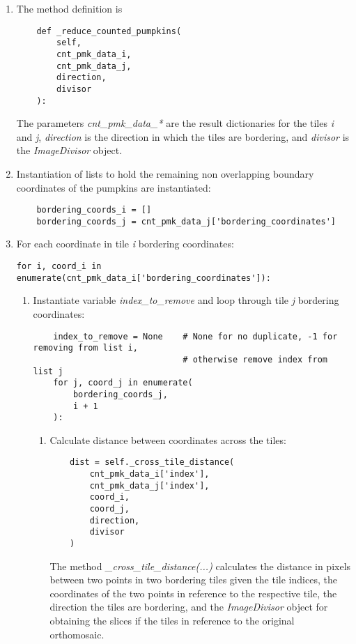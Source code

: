 \documentclass[../Head/Main.tex]{subfiles}
\begin{document}
\begin{enumerate}
\item The method definition is
\begin{verbatim}
    def _reduce_counted_pumpkins(
        self,
        cnt_pmk_data_i,
        cnt_pmk_data_j,
        direction,
        divisor
    ):
\end{verbatim}
The parameters \textit{cnt\_pmk\_data\_*} are the result dictionaries for the tiles \textit{i} and \textit{j}, \textit{direction} is the direction in which the tiles are bordering, and \textit{divisor} is the \textit{ImageDivisor} object.
\item Instantiation of lists to hold the remaining non overlapping boundary coordinates of the pumpkins are instantiated:
\begin{verbatim}
    bordering_coords_i = []
    bordering_coords_j = cnt_pmk_data_j['bordering_coordinates']
\end{verbatim}
\item For each coordinate in tile \textit{i} bordering coordinates:
\begin{verbatim}
for i, coord_i in enumerate(cnt_pmk_data_i['bordering_coordinates']):
\end{verbatim}
\begin{enumerate}
\item Instantiate variable \textit{index\_to\_remove} and loop through tile \textit{j} bordering coordinates:
\begin{verbatim}
    index_to_remove = None    # None for no duplicate, -1 for removing from list i, 
                              # otherwise remove index from list j
    for j, coord_j in enumerate(
        bordering_coords_j,
        i + 1
    ):
\end{verbatim}
\begin{enumerate}
\item Calculate distance between coordinates across the tiles:
\begin{verbatim}
    dist = self._cross_tile_distance(
        cnt_pmk_data_i['index'],
        cnt_pmk_data_j['index'],
        coord_i,
        coord_j,
        direction,
        divisor
    )
\end{verbatim}
The method \textit{\_cross\_tile\_distance(...)} calculates the distance in pixels between two points in two bordering tiles given the tile indices, the coordinates of the two points in reference to the respective tile, the direction the tiles are bordering, and the \textit{ImageDivisor} object for obtaining the slices if the tiles in reference to the original orthomosaic.

\end{enumerate}
\end{enumerate}
\end{enumerate}
\end{document}
